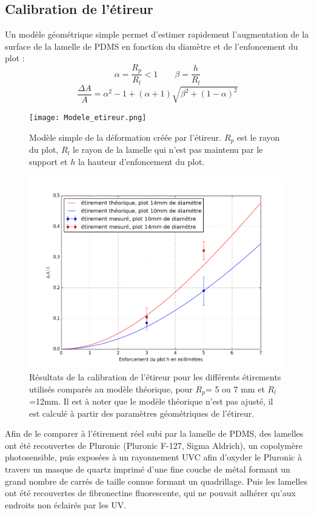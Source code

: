 	\subsection{Calibration de l'étireur}
	
	Un modèle géométrique simple permet d'estimer rapidement l'augmentation de la surface de la lamelle de PDMS en fonction du diamètre et de l'enfoncement du plot : 
	$$\alpha=\frac{R_p}{R_l}<1 \qquad \beta=\frac{h}{R_l}$$
	$$ \frac{\Delta A}{A} = \alpha^2-1+(\alpha+1)\sqrt{\beta^2+(1-\alpha)^2}$$ 	
		
	\begin{figure}[h!]
		\texttt{[image: Modele\_etireur.png]}
		\caption{Modèle simple de la déformation créée par l'étireur. $R_p$ est le rayon du plot, $R_l$ le rayon de la lamelle qui n'est pas maintenu par le support et $h$ la hauteur d'enfoncement du plot.}
		\end{figure}	
		
		\begin{figure}
		\includegraphics[scale=0.4]{Figures/Calibration_etireur.png} 
		\caption{Résultats de la calibration de l'étireur pour les différents étirements utilisés comparés au modèle théorique, pour $R_p$= 5 ou 7 mm et $R_l$=12mm. Il est à noter que le modèle théorique n'est pas ajusté, il est calculé à partir des paramètres géométriques de l'étireur.}
		\end{figure}
	Afin de le comparer à l'étirement réel subi par la lamelle de PDMS, des lamelles ont été recouvertes de Pluronic (Pluronic F-127, Sigma Aldrich), un copolymère photosensible, puis exposées à un rayonnement UVC afin d'oxyder le Pluronic à travers un masque de quartz imprimé d'une fine couche de métal formant un grand nombre de carrés de taille connue formant un quadrillage. Puis les lamelles ont été recouvertes de fibronectine fluorescente, qui ne pouvait adhérer qu'aux endroits non éclairés par les UV. 
	
